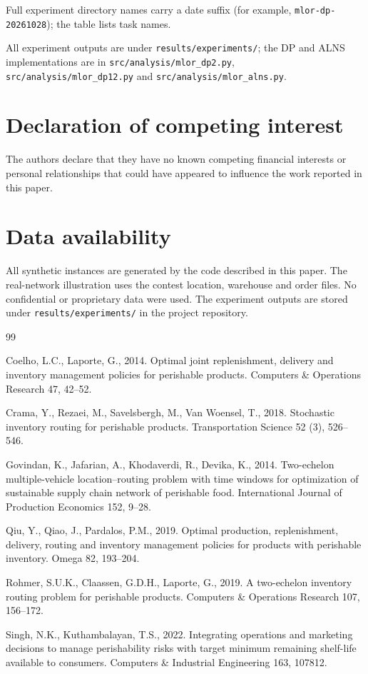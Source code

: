\documentclass[preprint,12pt]{elsarticle}
\begin{document}
{\small\sloppy Full experiment directory names carry a date suffix (for example, \texttt{mlor-dp-20261028}); the table lists task names.

All experiment outputs are under \texttt{results/experiments/}; the DP and ALNS implementations are in \texttt{src/analysis/mlor\_dp2.py}, \texttt{src/analysis/mlor\_dp12.py} and \texttt{src/analysis/mlor\_alns.py}.}

\section*{Declaration of competing interest}

The authors declare that they have no known competing financial interests or personal relationships that could have appeared to influence the work reported in this paper.

\section*{Data availability}

All synthetic instances are generated by the code described in this paper. The real-network illustration uses the contest location, warehouse and order files. No confidential or proprietary data were used. The experiment outputs are stored under \texttt{results/experiments/} in the project repository.

\begin{thebibliography}{99}

Coelho, L.C., Laporte, G., 2014. Optimal joint replenishment, delivery and inventory management policies for perishable products. Computers \& Operations Research 47, 42--52.

Crama, Y., Rezaei, M., Savelsbergh, M., Van Woensel, T., 2018. Stochastic inventory routing for perishable products. Transportation Science 52 (3), 526--546.

Govindan, K., Jafarian, A., Khodaverdi, R., Devika, K., 2014. Two-echelon multiple-vehicle location--routing problem with time windows for optimization of sustainable supply chain network of perishable food. International Journal of Production Economics 152, 9--28.

Qiu, Y., Qiao, J., Pardalos, P.M., 2019. Optimal production, replenishment, delivery, routing and inventory management policies for products with perishable inventory. Omega 82, 193--204.

Rohmer, S.U.K., Claassen, G.D.H., Laporte, G., 2019. A two-echelon inventory routing problem for perishable products. Computers \& Operations Research 107, 156--172.

Singh, N.K., Kuthambalayan, T.S., 2022. Integrating operations and marketing decisions to manage perishability risks with target minimum remaining shelf-life available to consumers. Computers \& Industrial Engineering 163, 107812.

\end{thebibliography}
\end{document}
